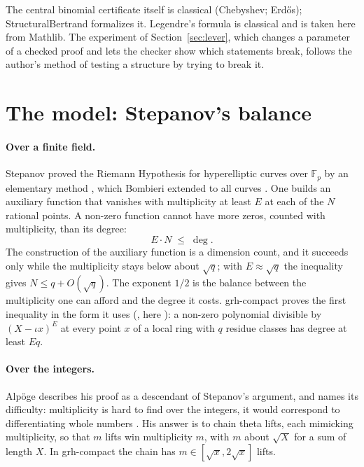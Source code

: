 \documentclass[11pt]{article}
\theoremstyle{definition}
\theoremstyle{remark}
\begin{document}
The central binomial certificate itself is classical (Chebyshev; Erdős); StructuralBertrand
formalizes it. Legendre's formula is classical and is taken here from Mathlib. The experiment of
Section~\ref{sec:lever}, which changes a parameter of a checked proof and lets the checker show
which statements break, follows the author's method of testing a structure by trying to break it.

\section{The model: Stepanov's balance}\label{sec:stepanov}

\paragraph{Over a finite field.} Stepanov proved the Riemann Hypothesis for hyperelliptic curves
over $\mathbb F_p$ by an elementary method \cite{Stepanov1969}, which Bombieri extended to all curves
\cite{Bombieri1973}. One builds an auxiliary function that vanishes with multiplicity at least $E$
at each of the $N$ rational points. A non-zero function cannot have more zeros, counted with
multiplicity, than its degree:
\[
E\cdot N\;\le\;\deg .
\]
The construction of the auxiliary function is a dimension count, and it succeeds only while the
multiplicity stays below about $\sqrt q$; with $E\approx\sqrt q$ the inequality gives
$N\le q+O(\sqrt q)$. The exponent $1/2$ is the balance between the multiplicity one can afford and
the degree it costs. grh-compact proves the first inequality in the form it uses
(, here ): a non-zero polynomial divisible by
$(X-\iota x)^E$ at every point $x$ of a local ring with $q$ residue classes has degree at least
$Eq$.

\paragraph{Over the integers.} Alpöge describes his proof as a descendant of Stepanov's argument,
and names its difficulty: multiplicity is hard to find over the integers, it would correspond to
differentiating whole numbers \cite{Alpoge2026}. His answer is to chain theta lifts, each mimicking
multiplicity, so that $m$ lifts win multiplicity $m$, with $m$ about $\sqrt X$ for a sum of
length $X$. In grh-compact the chain has $m\in[\sqrt x,2\sqrt x]$ lifts.
\end{document}
